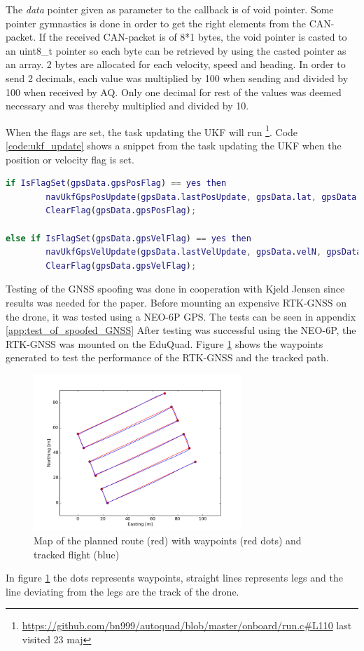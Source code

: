 The \textit{data} pointer given as parameter to the callback is of void pointer. Some pointer gymnastics is done in order to get the right elements from the CAN-packet. If the received CAN-packet is of 8*1 bytes, the void pointer is casted to an uint8\_t pointer so each byte can be retrieved by using the casted pointer as an array. 
2 bytes are allocated for each velocity, speed and heading. In order to send 2 decimals, each value was multiplied by 100 when sending and divided by 100 when received by \ac{AQ}.
Only one decimal for rest of the values was deemed necessary and was thereby multiplied and divided by 10.

When the flags are set, the task updating the \ac{UKF} will run \footnote{\url{https://github.com/bn999/autoquad/blob/master/onboard/run.c\#L110} last visited 23 maj}.
Code \ref{code:ukf_update} shows a snippet from the task updating the UKF when the position or velocity flag is set.
\begin{lstlisting}[language = Matlab, caption = Snippet of run.c as psudeocode which updates the UKF when position flag or velocity flag is set, label=code:ukf_update]
if IsFlagSet(gpsData.gpsPosFlag) == yes then
	    navUkfGpsPosUpdate(gpsData.lastPosUpdate, gpsData.lat, gpsData.lon, gpsData.height, ....);
	    ClearFlag(gpsData.gpsPosFlag);
	    
else if IsFlagSet(gpsData.gpsVelFlag) == yes then
	    navUkfGpsVelUpdate(gpsData.lastVelUpdate, gpsData.velN, gpsData.velE, ....);
	    ClearFlag(gpsData.gpsVelFlag);
\end{lstlisting}

Testing of the GNSS spoofing was done in cooperation with Kjeld Jensen since results was needed for the paper.
Before mounting an expensive RTK-GNSS on the drone, it was tested using a NEO-6P  GPS. The tests can be seen in appendix \ref{app:test_of_spoofed_GNSS}
After testing was successful using the NEO-6P, the RTK-GNSS was mounted on the EduQuad.
Figure \ref{fig:rtk_test_route} shows the waypoints generated to test the performance of the RTK-GNSS and the tracked path.

\begin{figure}[H]
    \center
    \includegraphics[width=0.7\textwidth]{graphics/rtk_test_planner.png}
    \caption{ Map of the planned route (red) with waypoints (red dots) and tracked flight (blue) }
    \label{fig:rtk_test_route}
\end{figure}
In figure \ref{fig:rtk_test_route} the dots represents waypoints, straight lines represents legs and the line deviating from the legs are the track of the drone.

